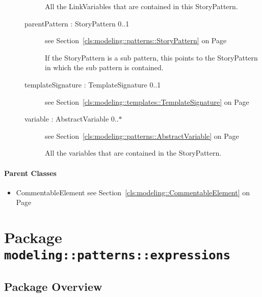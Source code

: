\begin{description}
\begin{description}
	
			
All the LinkVariables that are contained in this StoryPattern.	
		
	
\item[parentPattern : StoryPattern 			\symbol{"5B}0..1\symbol{"5D}]
see Section~\ref{cls:modeling::patterns::StoryPattern} on Page~\pageref{cls:modeling::patterns::StoryPattern}
\hspace{\fill}
\nopagebreak


	
			
If the StoryPattern is a sub pattern, this points to the StoryPattern in which the sub pattern is contained.	
		
	
\item[templateSignature : TemplateSignature 			\symbol{"5B}0..1\symbol{"5D}]
see Section~\ref{cls:modeling::templates::TemplateSignature} on Page~\pageref{cls:modeling::templates::TemplateSignature}
\hspace{\fill}
\nopagebreak


	
\item[variable : AbstractVariable 			\symbol{"5B}0..$*$\symbol{"5D}]
see Section~\ref{cls:modeling::patterns::AbstractVariable} on Page~\pageref{cls:modeling::patterns::AbstractVariable}
\hspace{\fill}
\nopagebreak


	
			
All the variables that are contained in the StoryPattern.	
		
	
	\end{description}
	

\end{description}

\paragraph{Parent Classes}
\begin{itemize}
\item CommentableElement see Section~\ref{cls:modeling::CommentableElement} on Page~\pageref{cls:modeling::CommentableElement}\end{itemize}
\newpage
		


\section{Package \bfseries \texttt{modeling::patterns::expressions}\normalfont}
\subsection{Package Overview}
			
